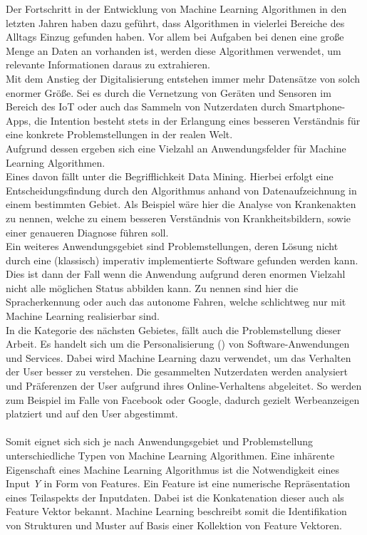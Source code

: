 Der Fortschritt in der Entwicklung von Machine Learning Algorithmen in den letzten Jahren haben dazu geführt, dass Algorithmen in vielerlei Bereiche des Alltags Einzug gefunden haben. Vor allem bei Aufgaben bei denen eine große Menge an Daten an vorhanden ist, werden diese Algorithmen verwendet, um relevante Informationen daraus zu extrahieren. \\
Mit dem Anstieg der Digitalisierung entstehen immer mehr Datensätze von solch enormer Größe. Sei es durch die Vernetzung von Geräten und Sensoren im Bereich des IoT oder auch das Sammeln von Nutzerdaten durch Smartphone-Apps, die Intention besteht stets in der Erlangung eines besseren Verständnis für eine konkrete Problemstellungen in der realen Welt. \\
Aufgrund dessen ergeben sich eine Vielzahl an Anwendungsfelder für Machine Learning Algorithmen.\\
Eines davon fällt unter die Begrifflichkeit Data Mining. Hierbei erfolgt eine Entscheidungsfindung durch den Algorithmus anhand von Datenaufzeichnung in einem bestimmten Gebiet. Als Beispiel wäre hier die Analyse von Krankenakten zu nennen, welche zu einem besseren Verständnis von Krankheitsbildern, sowie einer genaueren Diagnose führen soll. \\
Ein weiteres Anwendungsgebiet sind Problemstellungen, deren Lösung nicht durch eine (klassisch) imperativ implementierte Software gefunden werden kann.
Dies ist dann der Fall wenn die Anwendung aufgrund deren enormen Vielzahl nicht alle möglichen Status abbilden kann. Zu nennen sind hier die Spracherkennung oder auch das autonome Fahren, welche schlichtweg nur mit Machine Learning realisierbar sind.\\
In die Kategorie des nächsten Gebietes, fällt auch die Problemstellung dieser Arbeit. Es handelt sich um die Personalisierung () von Software-Anwendungen und Services. Dabei wird Machine Learning dazu verwendet, um das Verhalten der User besser zu verstehen. Die gesammelten Nutzerdaten werden analysiert und Präferenzen der User aufgrund ihres Online-Verhaltens abgeleitet. So werden zum Beispiel im Falle von Facebook oder Google, dadurch gezielt Werbeanzeigen platziert und auf den User abgestimmt.\cite{mlmitchel} \\\\
Somit eignet sich sich je nach Anwendungsgebiet und Problemstellung unterschiedliche Typen von Machine Learning Algorithmen. 
Eine inhärente Eigenschaft eines Machine Learning Algorithmus ist die Notwendigkeit eines Input \textit{Y} in Form von Features. Ein Feature ist eine numerische Repräsentation eines Teilaspekts der Inputdaten. Dabei ist die Konkatenation dieser auch als Feature Vektor bekannt. Machine Learning beschreibt somit die Identifikation von Strukturen und Muster auf Basis einer Kollektion von Feature Vektoren. \cite{fteng} \\\\
